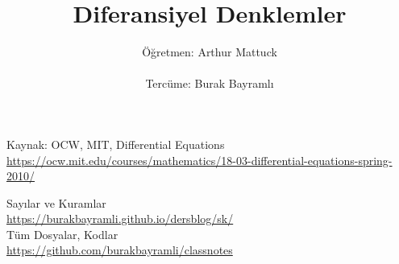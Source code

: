 \documentclass[12pt,a4paper]{report}
\title{Diferansiyel Denklemler}
\author{Öğretmen: Arthur Mattuck \\ \\ Tercüme: Burak Bayramlı}
\date{}
\begin{document}
\maketitle

\newpage


\begin{figure}[!hbp]
\end{figure}

\begin{center}

\vspace*{3cm}
Kaynak: OCW, MIT, Differential Equations \\
\vspace{0.5cm}
\url{https://ocw.mit.edu/courses/mathematics/18-03-differential-equations-spring-2010/} %
\vspace{0.5cm}
  
Sayılar ve Kuramlar\\
\vspace{0.5cm}
\url{https://burakbayramli.github.io/dersblog/sk/}\\
\vspace{0.5cm}
Tüm Dosyalar, Kodlar\\
\vspace{0.5cm}
\url{https://github.com/burakbayramli/classnotes}\\
\end{center}
\end{document}
